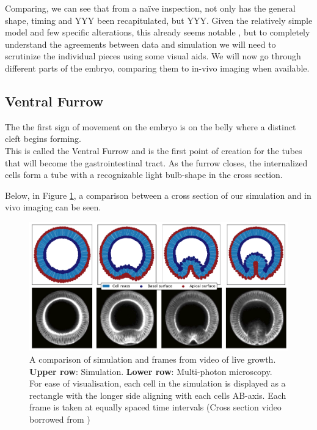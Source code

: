 Comparing, we can see that from a naïve inspection, not only has the general shape, timing and YYY been recapitulated, but YYY.  Given the relatively simple model and few specific alterations, this already seems notable , but to completely understand the agreements between data and simulation we will need to scrutinize the individual pieces using some visual aids. We will now go through different parts of the embryo, comparing them to in-vivo imaging when available.


\subsection{Ventral Furrow}
The the first sign of movement on the embryo is on the belly where a distinct cleft begins forming. \\
This is called the Ventral Furrow and is the first point of creation for the tubes that will become the gastrointestinal tract.
As the furrow closes, the internalized cells form a tube with a recognizable light bulb-shape in the cross section. 

Below, in Figure \ref{fig:VFComparison}, a comparison between a cross section of our simulation and in vivo imaging can be seen.

\begin{figure}[H]
    \centering
    \includegraphics[width=1\linewidth]{chapters/Results/figures/VF_comparison.png}
    \caption{A comparison of simulation and frames from video of live growth. \\\textbf{Upper row}: Simulation. \textbf{Lower row}: Multi-photon microscopy. \\For ease of visualisation, each cell in the simulation is displayed as a rectangle with the longer side aligning with each cells AB-axis. Each frame is taken at equally spaced time intervals (Cross section video borrowed from )}
    \label{fig:VFComparison}
\end{figure}

